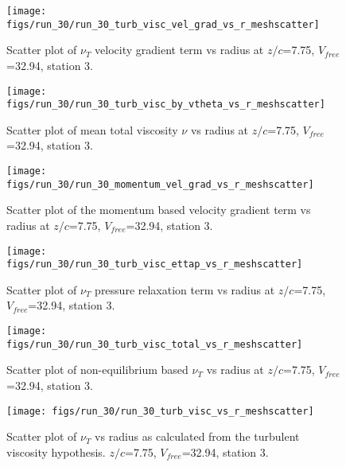 \begin{figure}[H]
\centering
\texttt{[image: figs/run\_30/run\_30\_turb\_visc\_vel\_grad\_vs\_r\_meshscatter]}
\caption{Scatter plot of $\nu_T$ velocity gradient term vs radius at $z/c$=7.75, $V_{free}$=32.94, station 3.}
\end{figure}


\begin{figure}[H]
\centering
\texttt{[image: figs/run\_30/run\_30\_turb\_visc\_by\_vtheta\_vs\_r\_meshscatter]}
\caption{Scatter plot of mean total viscosity $\nu$ vs radius at $z/c$=7.75, $V_{free}$=32.94, station 3.}
\end{figure}


\begin{figure}[H]
\centering
\texttt{[image: figs/run\_30/run\_30\_momentum\_vel\_grad\_vs\_r\_meshscatter]}
\caption{Scatter plot of the momentum based velocity gradient term vs radius at $z/c$=7.75, $V_{free}$=32.94, station 3.}
\end{figure}


\begin{figure}[H]
\centering
\texttt{[image: figs/run\_30/run\_30\_turb\_visc\_ettap\_vs\_r\_meshscatter]}
\caption{Scatter plot of $\nu_T$ pressure relaxation term vs radius at $z/c$=7.75, $V_{free}$=32.94, station 3.}
\end{figure}


\begin{figure}[H]
\centering
\texttt{[image: figs/run\_30/run\_30\_turb\_visc\_total\_vs\_r\_meshscatter]}
\caption{Scatter plot of non-equilibrium based $\nu_T$ vs radius at $z/c$=7.75, $V_{free}$=32.94, station 3.}
\end{figure}


\begin{figure}[H]
\centering
\texttt{[image: figs/run\_30/run\_30\_turb\_visc\_vs\_r\_meshscatter]}
\caption{Scatter plot of $\nu_T$ vs radius as calculated from the turbulent viscosity hypothesis. $z/c$=7.75, $V_{free}$=32.94, station 3.}
\end{figure}


